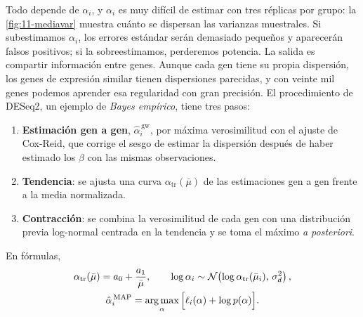 Todo depende de $\alpha_i$, y $\alpha_i$ es muy difícil de estimar con tres réplicas por grupo: la \cref{fig:11-mediavar} muestra cuánto se dispersan las varianzas muestrales. Si subestimamos $\alpha_i$, los errores estándar serán demasiado pequeños y aparecerán falsos positivos; si la sobreestimamos, perderemos potencia. La salida es compartir información entre genes. Aunque cada gen tiene su propia dispersión, los genes de expresión similar tienen dispersiones parecidas, y con veinte mil genes podemos aprender esa regularidad con gran precisión. El procedimiento de DESeq2, un ejemplo de \emph{Bayes empírico}, tiene tres pasos:
\begin{enumerate}
  \item \textbf{Estimación gen a gen}, $\hat\alpha_i^{\,\mathrm{gw}}$, por máxima verosimilitud con el ajuste de Cox-Reid, que corrige el sesgo de estimar la dispersión después de haber estimado los $\beta$ con las mismas observaciones.
  \item \textbf{Tendencia}: se ajusta una curva $\alpha_{\mathrm{tr}}(\bar\mu)$ de las estimaciones gen a gen frente a la media normalizada.
  \item \textbf{Contracción}: se combina la verosimilitud de cada gen con una distribución previa log-normal centrada en la tendencia y se toma el máximo \emph{a posteriori}.
\end{enumerate}
En fórmulas,
\begin{gather}
\alpha_{\mathrm{tr}}(\bar\mu)=a_0+\frac{a_1}{\bar\mu},\qquad
\log\alpha_i\sim\mathcal N\!\left(\log\alpha_{\mathrm{tr}}(\bar\mu_i),\,\sigma_d^2\right),\label{eq:11-disp}\\
\hat\alpha_i^{\,\mathrm{MAP}}=\operatorname*{arg\,max}_{\alpha}\Big[\ell_i(\alpha)+\log p(\alpha)\Big].\label{eq:11-map}
\end{gather}

\begin{simbolos}
\end{simbolos}

